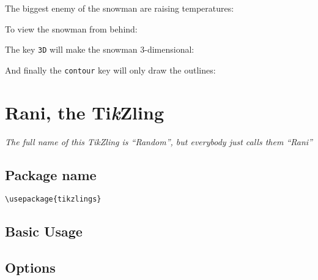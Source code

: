 \documentclass[parskip=half]{scrartcl}
\begin{document}
The biggest enemy of the snowman are raising temperatures:
\begin{tcblisting}{}
\end{tcblisting}

To view the snowman from behind:
\begin{tcblisting}{}
\snowman[back]
\end{tcblisting}

The key \lstinline|3D| will make the snowman 3-dimensional:
\begin{tcblisting}{}
\snowman[3D]
\end{tcblisting}

And finally the \lstinline|contour| key will only draw the outlines:
\begin{tcblisting}{}
\snowman[contour=black]
\end{tcblisting}

%
%
\clearpage
\section[Ti\emph{k}Zling]{Rani, the Ti\emph{k}Zling}

\emph{The full name of this Ti\emph{k}Zling is ``Random'', but everybody just calls them ``Rani''}

\subsection{Package name}

\begin{tcolorbox}[lower separated=false, lefthand width=.8\linewidth]
\vspace*{0.5cm}
\lstinline|\usepackage{tikzlings}|
\vspace*{0.5cm}
\end{tcolorbox}

\subsection{Basic Usage}

\begin{tcblisting}{}
\tikzling
\end{tcblisting}

\subsection{Options}
\end{document}
